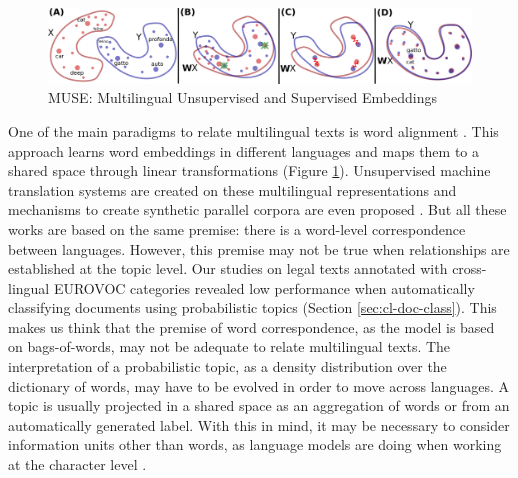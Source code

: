 \begin{figure}[ht]
    \centering
    \includegraphics[width=\linewidth]{muse.png}
    \caption{MUSE: Multilingual Unsupervised and Supervised Embeddings \citep{Lample2018}}
    \label{fig:muse}
\end{figure}


One of the main paradigms to relate multilingual texts is word alignment \citep{joulin2018loss, Lample2018}. This approach learns word embeddings in different languages and maps them to a shared space through linear transformations (Figure \ref{fig:muse}). Unsupervised machine translation systems are created on these multilingual representations and mechanisms to create synthetic parallel corpora are even proposed \citep{artetxe2019}. But all these works are based on the same premise: there is a word-level correspondence between languages. However, this premise may not be true when relationships are established at the topic level. Our studies on legal texts annotated with cross-lingual EUROVOC categories revealed low performance when automatically classifying documents using probabilistic topics (Section \ref{sec:cl-doc-class}). This makes us think that the premise of word correspondence, as the model is based on bags-of-words, may not be adequate to relate multilingual texts. The interpretation of a probabilistic topic, as a density distribution over the dictionary of words, may have to be evolved in order to move across languages. A topic is usually projected in a shared space as an aggregation of words or from an automatically generated label. With this in mind, it may be necessary to consider information units other than words, as language models are doing when working at the character level \citep{Al-Rfou_Choe_Constant_Guo_Jones_2019}.


